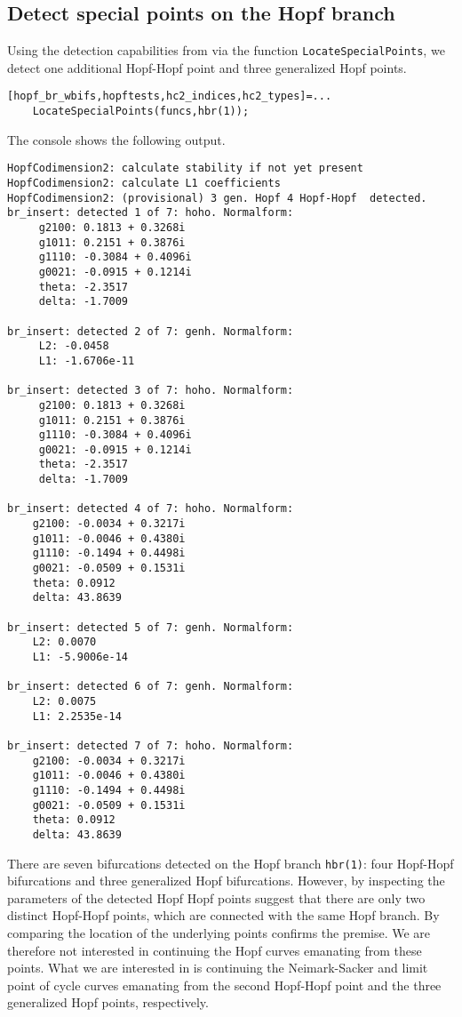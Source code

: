 \subsection{Detect special points on the Hopf branch}
Using the detection capabilities from \DDEBIFTOOL via the function \lstinline|LocateSpecialPoints|, we detect one additional Hopf-Hopf point and
three generalized Hopf points.
\begin{lstlisting}[style=customMatlab]
%% Detect codimension two points on hopf_br1
[hopf_br_wbifs,hopftests,hc2_indices,hc2_types]=...
    LocateSpecialPoints(funcs,hbr(1));
\end{lstlisting}
The \MATLAB console shows the following output.
\begin{lstlisting}[style=matlabConsole,keepspaces=true]
HopfCodimension2: calculate stability if not yet present
HopfCodimension2: calculate L1 coefficients
HopfCodimension2: (provisional) 3 gen. Hopf 4 Hopf-Hopf  detected.
br_insert: detected 1 of 7: hoho. Normalform:
     g2100: 0.1813 + 0.3268i
     g1011: 0.2151 + 0.3876i
     g1110: -0.3084 + 0.4096i
     g0021: -0.0915 + 0.1214i
     theta: -2.3517
     delta: -1.7009

br_insert: detected 2 of 7: genh. Normalform:
     L2: -0.0458
     L1: -1.6706e-11

br_insert: detected 3 of 7: hoho. Normalform:
     g2100: 0.1813 + 0.3268i
     g1011: 0.2151 + 0.3876i
     g1110: -0.3084 + 0.4096i
     g0021: -0.0915 + 0.1214i
     theta: -2.3517
     delta: -1.7009

br_insert: detected 4 of 7: hoho. Normalform:
    g2100: -0.0034 + 0.3217i
    g1011: -0.0046 + 0.4380i
    g1110: -0.1494 + 0.4498i
    g0021: -0.0509 + 0.1531i
    theta: 0.0912
    delta: 43.8639

br_insert: detected 5 of 7: genh. Normalform:
    L2: 0.0070
    L1: -5.9006e-14

br_insert: detected 6 of 7: genh. Normalform:
    L2: 0.0075
    L1: 2.2535e-14

br_insert: detected 7 of 7: hoho. Normalform:
    g2100: -0.0034 + 0.3217i
    g1011: -0.0046 + 0.4380i
    g1110: -0.1494 + 0.4498i
    g0021: -0.0509 + 0.1531i
    theta: 0.0912
    delta: 43.8639
\end{lstlisting}
There are seven bifurcations detected on the Hopf branch \lstinline|hbr(1)|: four Hopf-Hopf bifurcations and three generalized Hopf bifurcations. However, by inspecting the parameters of the detected Hopf Hopf points suggest that there are only two distinct Hopf-Hopf points,  which are connected with the same Hopf branch. By comparing the location of the underlying points confirms the premise. We are therefore not interested in continuing the Hopf curves emanating from these points. What we are interested in is continuing the Neimark-Sacker and limit point of cycle curves emanating from the second Hopf-Hopf point and the three generalized Hopf points, respectively.

